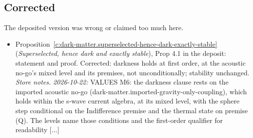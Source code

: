\documentclass[11pt]{article}
\theoremstyle{definition}
\theoremstyle{plain}
\begin{document}
\subsection*{Corrected}
The deposited version was wrong or claimed too much here.
\begin{itemize}\setlength{\itemsep}{2pt}
\item Proposition~\ref{c:dark-matter.superselected-hence-dark-exactly-stable} (\emph{Superselected, hence dark and exactly stable}), Prop 4.1 in the deposit: statement and proof. Corrected: darkness holds at first order, at the acoustic no-go's mixed level and its premises, not unconditionally; stability unchanged. \emph{Store notes.} \emph{2026-10-22:} VALUES M6: the darkness clause rests on the imported acoustic no-go (dark-matter.imported-gravity-only-coupling), which holds within the s-wave current algebra, at its mixed level, with the sphere step conditional on the Indifference premise and the thermal state on premise (Q). The levels name those conditions and the first-order qualifier for readability [...]
\end{itemize}
\end{document}
